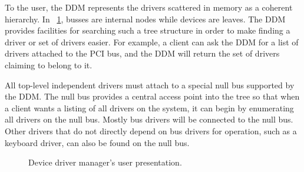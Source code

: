 
To the user, the DDM represents the drivers scattered in memory as a coherent
hierarchy.  In \figurename~\ref{fig:ddm_layout}, busses are internal nodes
while devices are leaves.
%
The DDM provides facilities for searching such a tree structure in order to make finding
a driver or set of drivers easier.  For example, a client can ask the DDM
for a list of drivers attached to the PCI bus, and the DDM will return the
set of drivers claiming to belong to it.

All top-level independent drivers must attach to a special {\important null
bus} supported by the DDM.  The null bus provides a central access point into
the tree so that when a client wants a listing of all drivers on the
system, it can begin by enumerating all drivers on the null bus.  Mostly
bus drivers will be connected to the null bus. Other drivers that do not
directly depend on bus drivers for operation, such as a keyboard driver, can
also be found on the null bus.

	\begin{figure}[tbp]
	\begin{center}
	\end{center}
	\caption{Device driver manager's user presentation.}
	\label{fig:ddm_layout}
	\end{figure}
